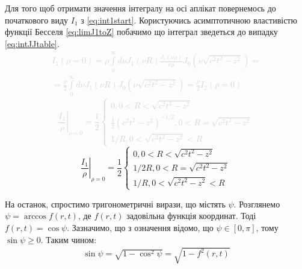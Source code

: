 Для того щоб отримати значення інтегралу на осі аплікат повернемось до 
початкового виду $ I_1 $ з \eqref{eq:int1start}. Користуючись асимптотичною 
властивістю функції Бесселя \eqref{eq:limJ1toZ} побачимо що інтеграл 
зведеться до випадку \eqref{eq:intJJtable}.
%
\textcolor{lightgray} {\begin{equation*} \begin{aligned}
I_1 \left( \rho = 0 \right) = \rho \int\limits_{0}^{\infty} d \nu
J_1 \left( \nu R \right) \frac{J_1 \left( \nu \rho \right) }{\nu \rho}
J_0 \left( \nu \sqrt{c^2 t^2 - z^2} \right) = \\
= \frac{\rho}{2} \int\limits_{0}^{\infty} d \nu
J_1 \left( \nu R \right) J_0 \left( \nu \sqrt{c^2 t^2 - z^2} \right) = 
\frac{\rho}{2} I_2 \left( \rho = 0 \right)
\end{aligned} \end{equation*} }
%
\textcolor{lightgray} {\begin{equation*}
\left. \frac{I_1}{\rho} \right|_{\rho = 0} = \frac{1}{2} \begin{cases}
0, 0 < R < \sqrt{c^2t^2 - z^2} \\
\frac{1}{2} \left( c^2t^2 - z^2 \right)^{-1/2}, 0 < R = \sqrt{c^2t^2 - z^2} \\ 
1/R, 0 < \sqrt{c^2t^2 - z^2} < R 
\end{cases}
\end{equation*} }
%
\begin{equation}
\left. \frac{I_1}{\rho} \right|_{\rho = 0} = \frac{1}{2} \begin{cases}
0, 0 < R < \sqrt{c^2t^2 - z^2} \\
1/2R, 0 < R = \sqrt{c^2t^2 - z^2} \\ 
1/R, 0 < \sqrt{c^2t^2 - z^2} < R 
\end{cases}
\end{equation}

На останок, спростимо тригонометричні вирази, що містять $ \psi $. Розглянемо 
$ \psi = \arccos f(r,t) $, де $ f(r,t) $ задовільна функція координат. 
Тоді $ f(r,t) = \cos \psi $. Зазначимо, що з означення відомо, що 
$ \psi \in \left[ 0, \pi \right] $, тому $ \sin \psi \geq 0 $. Таким чином:
%
\begin{equation*} \begin{aligned}
\sin \psi = \sqrt{1 - \cos^2 \psi } = \sqrt{1 - f^2(r,t)}
\end{aligned} \end{equation*}

